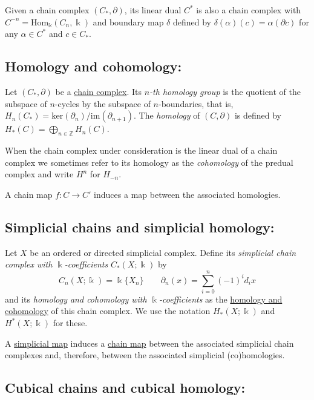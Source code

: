 \documentclass{amsart}
\begin{document}
	Given a chain complex $(C_*, \partial)$, its linear dual $C^*$ is also a chain complex with $C^{-n} = \mathrm{Hom_\Bbbk}(C_n, \Bbbk)$ and boundary map $\delta$ defined by $\delta(\alpha)(c) = \alpha(\partial c)$ for any $\alpha \in C^*$ and $c \in C_*$.
	
	\subsection*{Homology and cohomology:} \label{homology and cohomology}
	
	Let $(C_*, \partial)$ be a \hyperref[chain complex]{chain complex}. Its \textit{$n$-th homology group} is the quotient of the subspace of $n$-cycles by the subspace of $n$-boundaries, that is, $H_n(C_*) = \mathrm{ker}(\partial_n)/ \mathrm{im}(\partial_{n+1})$. The \textit{homology} of $(C, \partial)$ is defined by $H_*(C) = \bigoplus_{n \in \mathbb Z} H_n(C)$.
	
	When the chain complex under consideration is the linear dual of a chain complex we sometimes refer to its homology as the \textit{cohomology} of the predual complex and write $H^n$ for $H_{-n}$.
	
	A chain map $f : C \to C'$ induces a map between the associated homologies.
	
	\subsection*{Simplicial chains and simplicial homology:} \label{simplicial chains and simplicial homology}
	
	Let $X$ be an ordered or directed simplicial complex. Define its \textit{simplicial chain complex with $\Bbbk$-coefficients} $C_*(X; \Bbbk)$ by 
	\begin{equation*}
	C_n(X; \Bbbk) = \Bbbk\{X_n\} \qquad \partial_n(x) = \sum_{i=0}^{n} (-1)^i d_ix
	\end{equation*}
	and its \textit{homology and cohomology with $\Bbbk$-coefficients} as the \hyperref[homology and cohomology]{homology and cohomology} of this chain complex. We use the notation $H_*(X; \Bbbk)$ and $H^*(X; \Bbbk)$ for these.
	
	A \hyperref[abstract simplicial complex]{simplicial map} induces a \hyperref[chain complex]{chain map} between the associated simplicial chain complexes and, therefore, between the associated simplicial (co)homologies.
	
	\subsection*{Cubical chains and cubical homology:} \label{cubical chains and cubical homology}
	
\end{document}
